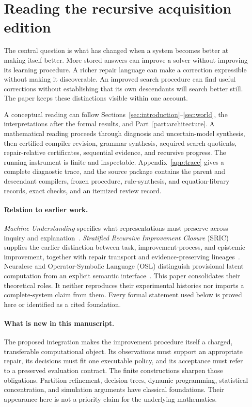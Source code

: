 \documentclass[11pt,letterpaper]{article}
\theoremstyle{plain}
\theoremstyle{definition}
\begin{document}
\section*{Reading the recursive acquisition edition}
The central question is what has changed when a system becomes better at making itself better. More stored answers can improve a solver without improving its learning procedure. A richer repair language can make a correction expressible without making it discoverable. An improved search procedure can find useful corrections without establishing that its own descendants will search better still. The paper keeps these distinctions visible within one account.

A conceptual reading can follow Sections~\ref{sec:introduction}--\ref{sec:world}, the interpretations after the formal results, and Part~\ref{part:architecture}. A mathematical reading proceeds through diagnosis and uncertain-model synthesis, then certified compiler revision, grammar synthesis, acquired search quotients, repair-relative certificates, sequential evidence, and recursive progress. The running instrument is finite and inspectable. Appendix~\ref{app:trace} gives a complete diagnostic trace, and the source package contains the parent and descendant compilers, frozen procedure, rule-synthesis, and equation-library records, exact checks, and an itemized review record.

\paragraph{Relation to earlier work.}
\emph{Machine Understanding} specifies what representations must preserve across inquiry and explanation~\cite{understanding}. \emph{Stratified Recursive Improvement Closure} (SRIC) supplies the earlier distinction between task, improvement-process, and epistemic improvement, together with repair transport and evidence-preserving lineages~\cite{sric}. Neuralese and Operator-Symbolic Language (OSL) distinguish provisional latent computation from an explicit semantic interface~\cite{neuralese,osl}. This paper consolidates their theoretical roles. It neither reproduces their experimental histories nor imports a complete-system claim from them. Every formal statement used below is proved here or identified as a cited foundation.

\paragraph{What is new in this manuscript.}
The proposed integration makes the improvement procedure itself a charged, transferable computational object. Its observations must support an appropriate repair, its decisions must fit one executable policy, and its acceptance must refer to a preserved evaluation contract. The finite constructions sharpen those obligations. Partition refinement, decision trees, dynamic programming, statistical concentration, and simulation arguments have classical foundations. Their appearance here is not a priority claim for the underlying mathematics.
\end{document}
